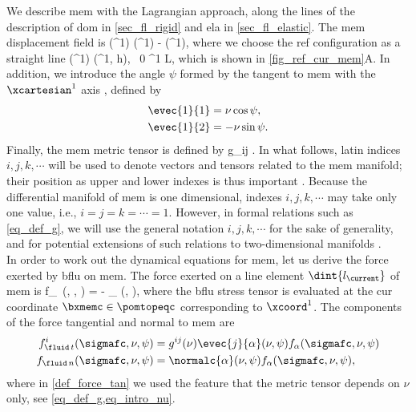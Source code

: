 We describe \ac{mem} with the Lagrangian approach, along the lines of the description of \ac{dom} in \cref{sec_fl_rigid} and \ac{ela}  in \cref{sec_fl_elastic}.  The \ac{mem} displacement field is
\be\label{eq_u_mem}
\bumem(\xcoord^1) \equiv \bxmemc(\xcoord^1) - \bxmemr(\xcoord^1),
\ee
where we choose the \ac{ref} configuration as a straight line
\be
\label{eq_def_x_ref}
\bxmemr(\xcoord^1) \equiv (\xcoord^1, h), \, 0 \leq  \xcoord^1 \leq L,
\ee
which is shown in \cref{fig_ref_cur_mem}A.
%
In addition, we introduce the  angle $\psi$ formed by the tangent to \ac{mem} with the $\xcartesian^1$ axis \cite{derenyiFormationInteractionMembrane2002}, defined by
\begin{align}
    \label{def_nu_psi_1}
    \evec{1}{1} & = \nu \cos \psi, \\
    \label{def_nu_psi_2}
    \evec{1}{2} & =-\nu \sin \psi.
\end{align}
Finally, the \ac{mem} metric tensor is defined by  \cite{marchiafavaAppuntiDiGeometria2005}
\be\label{eq_def_g}
g_{ij} \equiv {} \cdot {}.
\ee
In what follows, latin indices $i, j, k, \cdots$ will be used to denote vectors and tensors related to the \ac{mem} manifold; their position as upper and lower indexes is thus important \cite{marchiafavaAppuntiDiGeometria2005}. Because the differential manifold of \ac{mem} is one dimensional, indexes $i, j, k, \cdots$ may take only one value, i.e., $i=j=k= \cdots=1$. However, in formal relations such as \cref{eq_def_g}, we will use the general notation $i, j, k, \cdots$  for the sake of  generality, and for potential extensions of such relations to two-dimensional manifolds \cite{desernoFluidLipidMembranes2015}.
\vspace{0.5cm}\\


In order to work out the  dynamical equations for \ac{mem}, let us derive the force exerted by \ac{bflu} on \ac{mem}. The force exerted on a line element $\dint{l_\current}$ of \ac{mem}  is \cite{landauFluidMechanics1987}
\be
\label{def_f_fluid_mem}
f_{\fluid\, \alpha}(\sigmafc, \nu, \psi) = - \sigmastressc_{\alpha \beta} \normalc{\gamma}(\nu, \psi),
\ee
where the \ac{bflu} stress tensor is evaluated at the \ac{cur} coordinate $\bxmemc \in \pomtopeqc$ corresponding to $\xcoord^1$.
%
The components of the force  tangential and normal to \ac{mem} are \cite{desernoFluidLipidMembranes2015}
\begin{align}
    \label{def_force_tan}
    f_{\fluid\, t}^i(\sigmafc, \nu, \psi) & = g^{ij}(\nu) \evec{j}{\alpha}(\nu,\psi) f_\alpha(\sigmafc, \nu, \psi) \\
    \label{def_force_norm}
    f_{\fluid\, n} (\sigmafc, \nu, \psi)  & = \normalc{\alpha}(\nu, \psi) f_\alpha(\sigmafc, \nu, \psi),
\end{align}
where in \cref{def_force_tan} we used the feature that the metric tensor depends on $\nu$ only, see \cref{eq_def_g,eq_intro_nu}.

